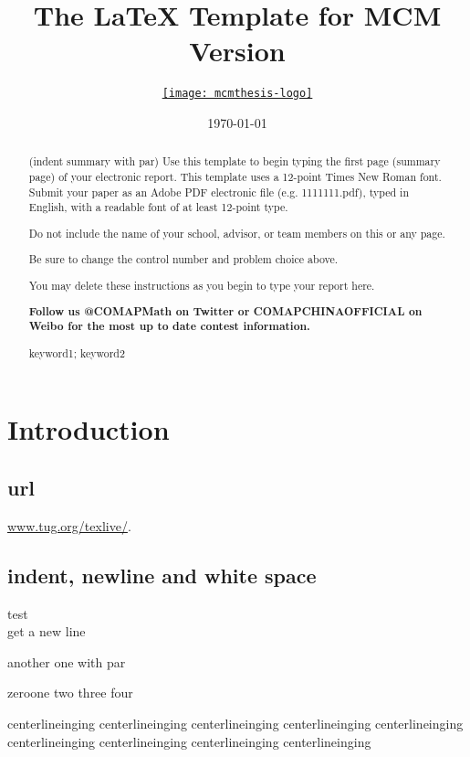 \documentclass{mcmthesis}
\title{The \LaTeX{} Template for MCM Version \MCMversion}
\author{\small \href{https://www.latexstudio.net/}
  {\texttt{[image: mcmthesis-logo]}}}
\date{\today}
\begin{document}
\begin{abstract}
\par(indent summary with par) Use this template to begin typing the first page (summary page) of your electronic report. This
template uses a 12-point Times New Roman font. Submit your paper as an Adobe PDF
electronic file (e.g. 1111111.pdf), typed in English, with a readable font of at least 12-point type. 

Do not include the name of your school, advisor, or team members on this or any page. 

Be sure to change the control number and problem choice above. 

You may delete these instructions as you begin to type your report here.  

\textbf{Follow us @COMAPMath on Twitter or COMAPCHINAOFFICIAL on Weibo for the
most up to date contest information.}

\begin{keywords}
keyword1; keyword2
\end{keywords}
\end{abstract}
\maketitle
\tableofcontents
\newpage
\memodate{\today}
\begin{memo}[Memorandum]
  \lipsum[1-3]
\end{memo}
\section{Introduction}
\subsection{url}
\url{www.tug.org/texlive/}.
\subsection{indent, newline and white space}
test \\
get a new line

\par another one with par

zeroone two  three   four

centerlineinging
centerlineinging
centerlineinging
centerlineinging
centerlineinging
centerlineinging
centerlineinging
centerlineinging
centerlineinging
\end{document}
